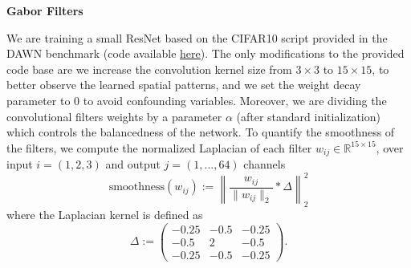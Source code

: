 \documentclass{article}
\theoremstyle{plain}
\theoremstyle{definition}
\theoremstyle{remark}
\begin{document}
\textbf{Gabor Filters}

We are training a small ResNet based on the CIFAR10 script provided in the DAWN benchmark (code available \href{https://github.com/davidcpage/cifar10-fast}{here}).
The only modifications to the provided code base are we increase the convolution kernel size from $3 \times 3$ to $15 \times 15$, to better observe the learned spatial patterns, and we set the weight decay parameter to $0$ to avoid confounding variables.
Moreover, we are dividing the convolutional filters weights by a parameter $\alpha$ (after standard initialization) which controls the balancedness of the network.
To quantify the smoothness of the filters, we compute the normalized Laplacian of each filter $w_{ij} \in \mathbb{R}^{15 \times 15}$, over input $i=(1, 2, 3)$ and output $j=(1, ..., 64)$ channels
\begin{equation}\label{eq:laplacian}
    \text{smoothness}(w_{ij}) := \left\lVert\frac{w_{ij}}{\|w_{ij}\|_2} \ast \Delta \right\rVert_2^2
\end{equation}
where the Laplacian kernel is defined as
\begin{equation}
    \Delta := \left(\begin{array}{ccc}
         -0.25 & -0.5 & -0.25\\
         -0.5 & 2 & -0.5 \\
         -0.25 & -0.5 & -0.25
    \end{array}\right).
\end{equation}
\end{document}
